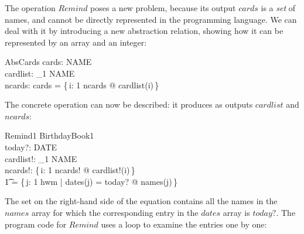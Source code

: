 \documentclass[12pt]{article}
\begin{document}
The operation $Remind$ poses a new problem, because its output $cards$
is a {\em set\/} of names, and cannot be directly
represented in the programming language. We can deal with it by introducing
a new abstraction relation, showing how it can be represented by an array
and an integer:
\begin{schema}{AbsCards}
	cards: \power NAME \\
	cardlist: \nat_1 \fun NAME \\
	ncards: \nat
\where
	cards = \{\,i: 1 \upto ncards @ cardlist(i)\,\}
\end{schema}
The concrete operation can now be described: it produces as outputs
$cardlist$ and $ncards$:
\begin{schema}{Remind1}
	\Xi BirthdayBook1 \\
	today?: DATE \\
	cardlist!: \nat_1 \fun NAME \\
	ncards!: \nat
\where
	\{\,i: 1 \upto ncards! @ cardlist!(i)\,\} \\
\t1		= \{\,j: 1 \upto hwm | dates(j) = today? @ names(j)\,\}
\end{schema}
The set on the right-hand side of the equation contains all the names
in the $names$ array for which the corresponding entry in the $dates$
array is $today?$.
The program code for $Remind$ uses a loop to examine the entries one by one:
\end{document}
